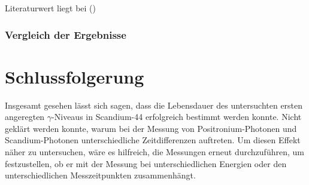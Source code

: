 \documentclass[
	a4paper,
	12pt,
	pagesize,
	ngerman
]{scrartcl}
\begin{document}
	Literaturwert liegt bei \SI{}{} (\cite{})

	\subsubsection{Vergleich der Ergebnisse}

	\section{Schlussfolgerung}
	Insgesamt gesehen lässt sich sagen, dass die Lebensdauer des untersuchten ersten angeregten $\gamma$-Niveaus in Scandium-44 erfolgreich bestimmt werden konnte.
	Nicht geklärt werden konnte, warum bei der Messung von Positronium-Photonen und Scandium-Photonen unterschiedliche Zeitdifferenzen auftreten.
	Um diesen Effekt näher zu untersuchen, wäre es hilfreich, die Messungen erneut durchzuführen, um festzustellen, ob er mit der Messung bei unterschiedlichen Energien oder den unterschiedlichen Messzeitpunkten zusammenhängt.

	\printbibliography %
\end{document}
